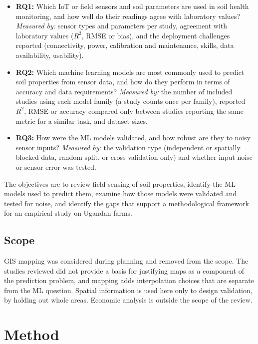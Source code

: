 \documentclass[conference]{IEEEtran}
\begin{document}
\begin{itemize}
\item \textbf{RQ1:} Which IoT or field sensors and soil parameters are used in
soil health monitoring, and how well do their readings agree with laboratory
values? \emph{Measured by:} sensor types and parameters per study, agreement
with laboratory values ($R^2$, RMSE or bias), and the deployment challenges
reported (connectivity, power, calibration and maintenance, skills, data
availability, usability).
\item \textbf{RQ2:} Which machine learning models are most commonly used to
predict soil properties from sensor data, and how do they perform in terms of
accuracy and data requirements? \emph{Measured by:} the number of included
studies using each model family (a study counts once per family), reported
$R^2$, RMSE or accuracy compared only between studies reporting the same metric
for a similar task, and dataset sizes.
\item \textbf{RQ3:} How were the ML models validated, and how robust are they to
noisy sensor inputs? \emph{Measured by:} the validation type (independent or
spatially blocked data, random split, or cross-validation only) and whether
input noise or sensor error was tested.
\end{itemize}

The objectives are to review field sensing of soil properties, identify the ML
models used to predict them, examine how those models were validated and tested
for noise, and identify the gaps that support a methodological framework for an
empirical study on Ugandan farms.

\subsection{Scope}
GIS mapping was considered during planning and removed from the scope. The
studies reviewed did not provide a basis for justifying maps as a component of
the prediction problem, and mapping adds interpolation choices that are separate
from the ML question. Spatial information is used here only to design validation,
by holding out whole areas.
Economic analysis is outside the scope of the review.

\section{Method}
\end{document}
